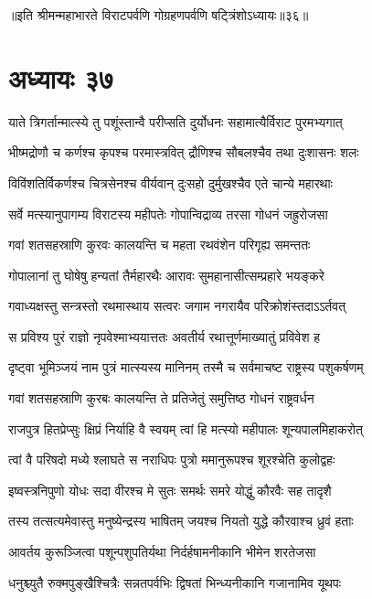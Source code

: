 ॥इति श्रीमन्महाभारते विराटपर्वणि गोग्रहणपर्वणि षट्त्रिंशोऽध्यायः॥३६॥

\chapter{अध्यायः ३७}

\twolineshloka
{याते त्रिगर्तान्मात्स्ये तु पशूंस्तान्वै परीप्सति}
{दुर्योधनः सहामात्यैर्विराट पुरमभ्यगात्}


\twolineshloka
{भीष्मद्रोणौ च कर्णश्च कृपश्च परमास्त्रवित्}
{द्रौणिश्च सौबलश्चैव तथा दुःशासनः शलः}


\twolineshloka
{विविंशतिर्विकर्णश्च चित्रसेनश्च वीर्यवान्}
{दुःसहो दुर्मुखश्चैव एते चान्ये महारथाः}


\twolineshloka
{सर्वे मत्स्यानुपागम्य विराटस्य महीपतेः}
{गोपान्विद्राव्य तरसा गोधनं जह्रुरोजसा}


\twolineshloka
{गवां शतसहस्राणि कुरवः कालयन्ति च}
{महता रथवंशेन परिगृह्य समन्ततः}


\twolineshloka
{गोपालानां तु घोषेषु हन्यतां तैर्महारथैः}
{आरावः सुमहानासीत्सम्प्रहारे भयङ्करे}


\twolineshloka
{गवाध्यक्षस्तु सन्त्रस्तो रथमास्थाय सत्वरः}
{जगाम नगरायैव परिक्रोशंस्तदाऽऽर्तवत्}


\twolineshloka
{स प्रविश्य पुरं राज्ञो नृपवेश्माभ्ययात्ततः}
{अवतीर्य रथात्तूर्णमाख्यातुं प्रविवेश ह}


\twolineshloka
{दृष्ट्वा भूमिञ्जयं नाम पुत्रं मात्स्यस्य मानिनम्}
{तस्मै च सर्वमाचष्ट राष्ट्रस्य पशुकर्षणम्}


\twolineshloka
{गवां शतसहस्राणि कुरबः कालयन्ति ते}
{प्रतिजेतुं समुत्तिष्ठ गोधनं राष्ट्रवर्धन}


\twolineshloka
{राजपुत्र हितप्रेप्सुः क्षिप्रं निर्याहि वै स्वयम्}
{त्वां हि मत्स्यो महीपालः शून्यपालमिहाकरोत्}


\twolineshloka
{त्वां वै परिषदो मध्ये श्लाघते स नराधिपः}
{पुत्रो ममानुरूपश्च शूरश्चेति कुलोद्वहः}


\twolineshloka
{इष्वस्त्रनिपुणो योधः सदा वीरश्च मे सुतः}
{समर्थः समरे योद्धुं कौरवैः सह तादृशै}


\twolineshloka
{तस्य तत्सत्यमेवास्तु मनुष्येन्द्रस्य भाषितम्}
{जयश्च नियतो युद्धे कौरवाश्च ध्रुवं हताः}


\twolineshloka
{आवर्तय कुरूञ्जित्वा पशून्पशुपतिर्यथा}
{निर्दर्हषामनीकानि भीमेन शरतेजसा}


\twolineshloka
{धनुश्च्युतै रुक्मपुङ्खैश्चित्रैः सन्नतपर्वभिः}
{द्विषतां भिन्ध्यनीकानि गजानामिव यूथपः}



